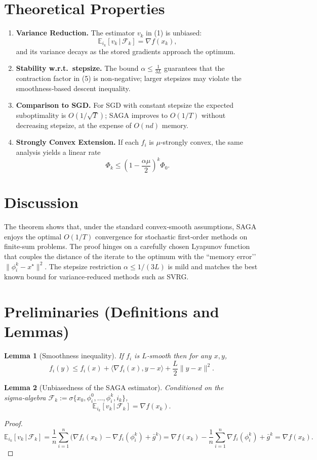 \documentclass{article}
\newtheorem{lemma}{Lemma}
\newcommand{\E}{\mathbb{E}}
\newcommand{\grad}{\nabla}
\begin{document}
\section*{Theoretical Properties}
\begin{enumerate}[label=\arabic*)]
\item \textbf{Variance Reduction.} The estimator $v_k$ in (1) is unbiased:
\[
\E_{i_k}[v_k\,|\,\mathcal{F}_k]=\grad f(x_k),
\]
and its variance decays as the stored gradients approach the optimum.
\item \textbf{Stability w.r.t.\ stepsize.} The bound $\alpha\le\frac{1}{3L}$ guarantees that the contraction factor in (5) is non‑negative; larger stepsizes may violate the smoothness‑based descent inequality.
\item \textbf{Comparison to SGD.} For SGD with constant stepsize the expected suboptimality is $O(1/\sqrt{T})$; SAGA improves to $O(1/T)$ without decreasing stepsize, at the expense of $O(nd)$ memory.
\item \textbf{Strongly Convex Extension.} If each $f_i$ is $\mu$‑strongly convex, the same analysis yields a linear rate
\[
\Phi_k\le\left(1-\frac{\alpha\mu}{2}\right)^k\Phi_0 .
\]
\end{enumerate}

\section*{Discussion}
The theorem shows that, under the standard convex‑smooth assumptions, SAGA enjoys the optimal $O(1/T)$ convergence for stochastic first‑order methods on finite‑sum problems. The proof hinges on a carefully chosen Lyapunov function that couples the distance of the iterate to the optimum with the “memory error’’ $\|\phi_i^k-x^\star\|^2$. The stepsize restriction $\alpha\le 1/(3L)$ is mild and matches the best known bound for variance‑reduced methods such as SVRG.

\newpage
\section*{Preliminaries (Definitions and Lemmas)}
\begin{lemma}[Smoothness inequality]\label{lem:smooth}
If $f_i$ is $L$‑smooth then for any $x,y$,
\[
f_i(y)\le f_i(x)+\langle\grad f_i(x),y-x\rangle+\frac{L}{2}\|y-x\|^2 .
\tag{L1}
\]
\end{lemma}
\begin{lemma}[Unbiasedness of the SAGA estimator]\label{lem:unbiased}
Conditioned on the sigma‑algebra $\mathcal{F}_k:=\sigma\{x_0,\phi_i^0,\dots,\phi_i^{k},i_k\}$,
\[
\E_{i_k}[v_k\,|\,\mathcal{F}_k]=\grad f(x_k).
\tag{L2}
\]
\end{lemma}
\begin{proof}
\[
\E_{i_k}[v_k\,|\,\mathcal{F}_k]=\frac1n\sum_{i=1}^n\bigl(\grad f_i(x_k)-\grad f_i(\phi_i^k)+\bar g^k\bigr)
= \grad f(x_k)-\frac1n\sum_{i=1}^n\grad f_i(\phi_i^k)+\bar g^k
= \grad f(x_k).
\]
\end{proof}
\end{document}
